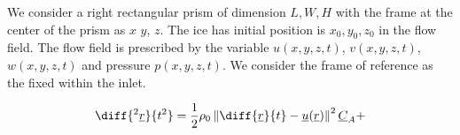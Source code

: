 \documentclass{book}
\begin{document}
We consider a right rectangular prism of dimension $L, W, H$ with the frame at the center of the prism as $x$ $y$, $z$. The ice has initial position is $x_0, y_0, z_0$ in the flow field. The flow field is prescribed by the variable $u(x,y,z,t)$, $v(x,y,z,t)$, $w(x,y,z,t)$ and pressure $p(x,y,z,t)$. We consider the frame of reference as the fixed within the inlet.

\begin{align*}
\diff{^2\underline{r}}{t^2} = \dfrac{1}{2}\rho_0 \left\|\diff{\underline{r}}{t}-\underline{u}(\underline{r})\right\|^2 \underline{C}_A + 
\end{align*}
\end{document}
